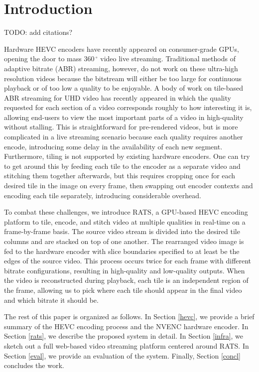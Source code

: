 
\section{Introduction} \label{intro}

TODO: add citations?

Hardware HEVC encoders have recently appeared on consumer-grade GPUs, opening the door to mass $360\,^{\circ}$ video live streaming. Traditional methods of adaptive bitrate (ABR) streaming, however, do not work on these ultra-high resolution videos because the bitstream will either be too large for continuous playback or of too low a quality to be enjoyable. A body of work on tile-based ABR streaming for UHD video has recently appeared in which the quality requested for each section of a video corresponds roughly to how interesting it is, allowing end-users to view the most important parts of a video in high-quality without stalling. This is straightforward for pre-rendered videos, but is more complicated in a live streaming scenario because each quality requires another encode, introducing some delay in the availability of each new segment. Furthermore, tiling is not supported by existing hardware encoders. One can try to get around this by feeding each tile to the encoder as a separate video and stitching them together afterwards, but this requires cropping once for each desired tile in the image on every frame, then swapping out encoder contexts and encoding each tile separately, introducing considerable overhead.

To combat these challenges, we introduce RATS, a GPU-based HEVC encoding platform to tile, encode, and stitch video at multiple qualities in real-time on a frame-by-frame basis. The source video stream is divided into the desired tile columns and are stacked on top of one another. The rearranged video image is fed to the hardware encoder with slice boundaries specified to at least be the edges of the source video. This process occurs twice for each frame with different bitrate configurations, resulting in high-quality and low-quality outputs. When the video is reconstructed during playback, each tile is an independent region of the frame, allowing us to pick where each tile should appear in the final video and which bitrate it should be.

The rest of this paper is organized as follows. In Section \ref{hevc}, we provide a brief summary of the HEVC encoding process and the NVENC hardware encoder. In Section \ref{rats}, we describe the proposed system in detail. In Section \ref{infra}, we sketch out a full web-based video streaming platform centered around RATS. In Section \ref{eval}, we provide an evaluation of the system. Finally, Section \ref{concl} concludes the work.

